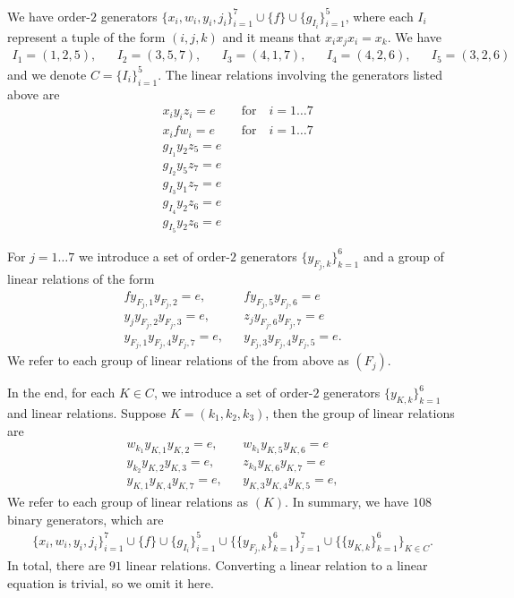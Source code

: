 We have order-$2$ generators $\{x_i, w_i, y_i, j_i\}_{i=1}^{7} \cup \{f\} \cup \{g_{I_i}\}_{i=1}^5$,
where each $I_i$ represent a tuple of the form $(i,j,k)$ and it means that $x_ix_jx_i = x_k$.
We have 
\begin{align}
	I_1 = (1,2,5), 
	&&I_2 = (3,5,7), 
	&&I_3 = (4,1,7), 
	&&I_4 = (4,2,6), 
	&&I_5 = (3,2,6)
\end{align} 
and we denote $C = \{I_i\}_{i=1}^5$.
The linear relations involving the generators listed above are
\begin{align}
	\label{eq:xyz} &x_i y_i z_i = e  &&\text{for} \quad i =1\dots 7 \\
	\label{eq:xfw} &x_i f w_i = e   &&\text{for} \quad i =1\dots 7 \\
	&g_{I_1} y_2z_5 =e \\
	&g_{I_2} y_5z_7 =e \\
	&g_{I_3} y_1z_7 =e \\
	&g_{I_4} y_2z_6 =e \\
	&g_{I_5} y_2z_6 =e 
\end{align}

For $j =1 \dots 7$ we introduce a set of order-$2$ generators 
$\{ y_{F_j,k}\}_{k=1}^6$ and
a group of linear relations of the form
\begin{align}
	f y_{F_j,1} y _{F_j,2} = e, && f y_{F_j,5} y_{F_j,6} = e \\
	y_j y_{F_j,2} y _{F_j,3} = e, && z_j y_{F_j,6} y_{F_j,7} = e \\
	y_{F_j,1} y_{F_j,4} y _{F_j,7} = e, && y_{F_j,3} y_{F_j,4} y_{F_j,5} = e.
\end{align}
We refer to each group of linear relations of the from above as $(F_j)$.

In the end, for each $K \in C$, 
we introduce a set of order-$2$ generators $\{y_{K,k}\}_{k=1}^6$ and
linear relations.
Suppose $K = (k_1,k_2,k_3)$, then the group of linear relations are
\begin{align}
	w_{k_1} y_{K,1} y _{K,2} = e, && w_{k_1} y_{K,5} y_{K,6} = e \\
	y_{k_2} y_{K,2} y _{K,3} = e, && z_{k_3} y_{K,6} y_{K,7} = e \\
	y_{K,1} y_{K,4} y _{K,7} = e, && y_{K,3} y_{K,4} y_{K,5} = e,
\end{align}
We refer to each group of linear relations as $(K)$.
In summary, we have $108$ binary generators, which are
\begin{align}
\{x_i, w_i, y_i, j_i\}_{i=1}^{7} \cup \{f\} \cup \{g_{I_i}\}_{i=1}^5\cup\{\{y_{F_j,k}\}_{k=1}^6\}_{j=1}^7
\cup \{\{y_{K,k}\}_{k=1}^6\}_{K \in C}.
\end{align}
In total, there are $91$ linear relations.
Converting a linear relation to a linear equation is trivial, so we omit it here.

